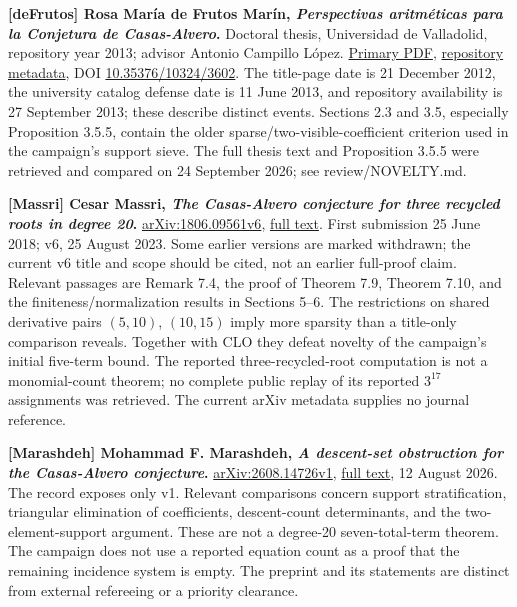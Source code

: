 \documentclass[
  british,
  10pt,
]{article}
\begin{document}
\textbf{{[}deFrutos{]} Rosa María de Frutos Marín, \emph{Perspectivas
aritméticas para la Conjetura de Casas-Alvero}.} Doctoral thesis,
Universidad de Valladolid, repository year 2013; advisor Antonio
Campillo López.
\href{https://uvadoc.uva.es/bitstream/handle/10324/3602/TESIS367-130927.pdf?isAllowed=y&sequence=1}{Primary
PDF},
\href{https://uvadoc.uva.es/handle/10324/3602?show=full}{repository
metadata}, DOI
\href{https://doi.org/10.35376/10324/3602}{10.35376/10324/3602}. The
title-page date is 21 December 2012, the university catalog defense date
is 11 June 2013, and repository availability is 27 September 2013; these
describe distinct events. Sections 2.3 and 3.5, especially Proposition
3.5.5, contain the older sparse/two-visible-coefficient criterion used
in the campaign's support sieve. The full thesis text and Proposition
3.5.5 were retrieved and compared on 24 September 2026; see
review/NOVELTY.md.

\textbf{{[}Massri{]} Cesar Massri, \emph{The Casas-Alvero conjecture for
three recycled roots in degree 20}.}
\href{https://arxiv.org/abs/1806.09561v6}{arXiv:1806.09561v6},
\href{https://arxiv.org/html/1806.09561v6}{full text}. First submission
25 June 2018; v6, 25 August 2023. Some earlier versions are marked
withdrawn; the current v6 title and scope should be cited, not an
earlier full-proof claim. Relevant passages are Remark 7.4, the proof of
Theorem 7.9, Theorem 7.10, and the finiteness/normalization results in
Sections 5--6. The restrictions on shared derivative pairs \((5,10)\),
\((10,15)\) imply more sparsity than a title-only comparison reveals.
Together with CLO they defeat novelty of the campaign's initial
five-term bound. The reported three-recycled-root computation is not a
monomial-count theorem; no complete public replay of its reported
\(3^{17}\) assignments was retrieved. The current arXiv metadata
supplies no journal reference.

\textbf{{[}Marashdeh{]} Mohammad F. Marashdeh, \emph{A descent-set
obstruction for the Casas-Alvero conjecture}.}
\href{https://arxiv.org/abs/2608.14726v1}{arXiv:2608.14726v1},
\href{https://arxiv.org/html/2608.14726v1}{full text}, 12 August 2026.
The record exposes only v1. Relevant comparisons concern support
stratification, triangular elimination of coefficients, descent-count
determinants, and the two-element-support argument. These are not a
degree-20 seven-total-term theorem. The campaign does not use a reported
equation count as a proof that the remaining incidence system is empty.
The preprint and its statements are distinct from external refereeing or
a priority clearance.
\end{document}
